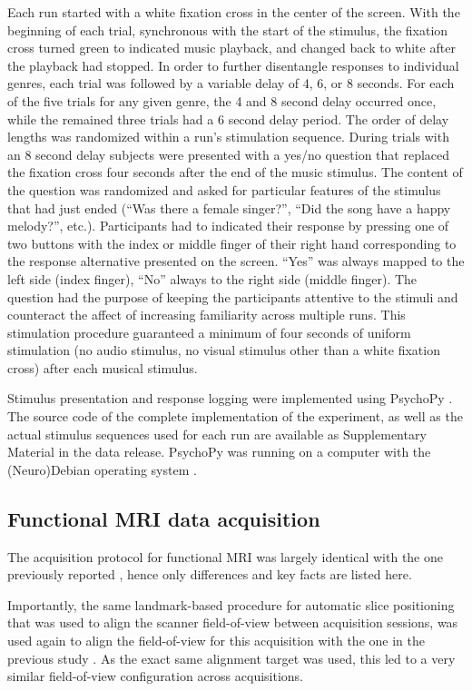 Each run started with a white fixation cross in the center of the screen. With
the beginning of each trial, synchronous with the start of the stimulus, the
fixation cross turned green to indicated music playback, and changed back to
white after the playback had stopped.  In order to further disentangle
responses to individual genres, each trial was followed by a variable delay of
4, 6, or 8 seconds. For each of the five trials for any given genre, the 4 and
8 second delay occurred once, while the remained three trials had a 6 second
delay period. The order of delay lengths was randomized within a run's
stimulation sequence. During trials with an 8 second delay subjects were
presented with a yes/no question that replaced the fixation cross four seconds
after the end of the music stimulus. The content of the question was randomized
and asked for particular features of the stimulus that had just ended (``Was
there a female singer?'', ``Did the song have a happy melody?'', etc.).
Participants had to indicated their response by pressing one of two buttons
with the index or middle finger of their right hand corresponding to the
response alternative presented on the screen. ``Yes'' was always mapped to the
left side (index finger), ``No'' always to the right side (middle finger).  The
question had the purpose of keeping the participants attentive to the stimuli and
counteract the affect of increasing familiarity across multiple runs.  This
stimulation procedure guaranteed a minimum of four seconds of uniform
stimulation (no audio stimulus, no visual stimulus other than a white fixation
cross) after each musical stimulus.

Stimulus presentation and response logging were implemented using PsychoPy
\cite{Pie2007}.  The source code of the complete implementation of the experiment, as
well as the actual stimulus sequences used for each run are available as
Supplementary Material in the data release. PsychoPy was running on a computer
with the (Neuro)Debian operating system \cite{HH12}.

\subsection*{Functional MRI data acquisition}

The acquisition protocol for functional MRI was largely identical with the one
previously reported \cite{HBI+14}, hence only differences and key facts are
listed here.

Importantly, the same landmark-based procedure for automatic slice positioning
that was used to align the scanner field-of-view between acquisition sessions,
was used again to align the field-of-view for this acquisition with the one in
the previous study \cite{HBI+14}. As the exact same alignment target was
used, this led to a very similar field-of-view configuration across
acquisitions.

